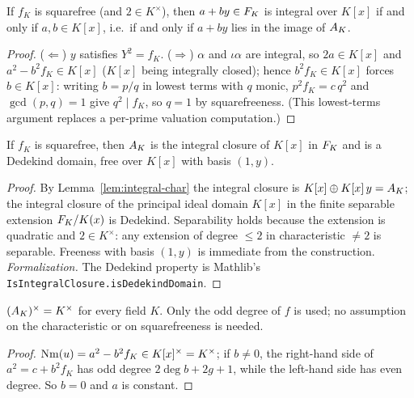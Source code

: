 \begin{lemma}
\label{lem:integral-char}
\leanok
{}
If $f_K$ is squarefree (and $2 \in K^\times$), then $a + by \in F_{K}$ is integral over
$K[x]$ if and only if $a, b \in K[x]$, i.e.\ if and only if $a + by$ lies in the image of
$A_{K}$.
\end{lemma}
\begin{proof}
\leanok
($\Leftarrow$) $y$ satisfies $Y^2 = f_K$. ($\Rightarrow$) $\alpha$ and $\iota\alpha$ are
integral, so $2a \in K[x]$ and $a^2 - b^2 f_K \in K[x]$ ($K[x]$ being integrally closed);
hence $b^2 f_K \in K[x]$ forces $b \in K[x]$: writing $b = p/q$ in lowest terms with $q$
monic, $p^2 f_K = c\,q^2$ and $\gcd(p,q) = 1$ give $q^2 \mid f_K$, so $q = 1$ by
squarefreeness. (This lowest-terms argument replaces a per-prime valuation computation.)
\end{proof}

\begin{theorem}
\label{thm:hypring-dedekind}
\leanok
{}
If $f_K$ is squarefree, then $A_{K}$ is the integral closure of $K[x]$ in $F_{K}$ and is a
Dedekind domain, free over $K[x]$ with basis $(1,y)$.
\end{theorem}
\begin{proof}
\leanok
{}
By Lemma~\ref{lem:integral-char} the integral closure is $K[x] \oplus K[x]\,y = A_{K}$;
the integral closure of the principal ideal domain $K[x]$ in the finite separable
extension $F_{K}/K(x)$ is Dedekind. Separability holds because the extension is quadratic
and $2 \in K^\times$: any extension of degree $\le 2$ in characteristic $\ne 2$ is
separable. Freeness with basis $(1,y)$ is immediate from the construction.
\emph{Formalization.} The Dedekind property is Mathlib's
\texttt{IsIntegralClosure.isDedekindDomain}.
\end{proof}

\begin{lemma}[Units]
\label{lem:hypring-units}
\leanok
{}
$(A_{K})^\times = K^\times$ for every field $K$. Only the odd degree of $f$ is used; no
assumption on the characteristic or on squarefreeness is needed.
\end{lemma}
\begin{proof}
\leanok
$\operatorname{Nm}(u) = a^2 - b^2 f_K \in K[x]^\times = K^\times$; if $b \ne 0$, the right-hand side of
$a^2 = c + b^2 f_K$ has odd degree $2\deg b + 2g + 1$, while the left-hand side has even
degree. So $b = 0$ and $a$ is constant.
\end{proof}

